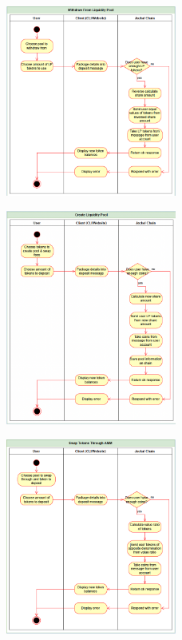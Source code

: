 \documentclass[a4paper]{article}
\begin{document}
\begin{figure}[!htbp]
\centering
\includegraphics[width=0.5\textwidth]{assets/lp3.png}
\caption{}
\end{figure}

\begin{figure}[!htbp]
\centering
\includegraphics[width=0.5\textwidth]{assets/lp4.png}
\caption{}
\end{figure}

\begin{figure}[!htbp]
\centering
\includegraphics[width=0.5\textwidth]{assets/lp5.png}
\caption{}
\end{figure}
\end{document}

